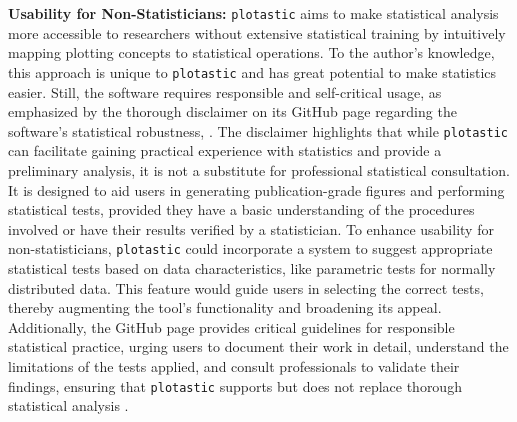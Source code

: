 \textbf{Usability for Non-Statisticians:} \texttt{plotastic} aims to make
statistical analysis more accessible to researchers without extensive
statistical training by intuitively mapping plotting concepts to statistical
operations. To the author's knowledge, this approach is unique to
\texttt{plotastic} and has great potential to make statistics easier. Still, the
software requires responsible and self-critical usage, as emphasized by the
thorough disclaimer on its GitHub page regarding the software's statistical
robustness, \cite{kuricMarkur4Plotastic2024}. The disclaimer highlights that
while \texttt{plotastic} can facilitate gaining practical experience with
statistics and provide a preliminary analysis, it is not a substitute for
professional statistical consultation. It is designed to aid users in generating
publication-grade figures and performing statistical tests, provided they have a
basic understanding of the procedures involved or have their results verified by
a statistician. To enhance usability for non-statisticians, \texttt{plotastic}
could incorporate a system to suggest appropriate statistical tests based on
data characteristics, like parametric tests for normally distributed data. This
feature would guide users in selecting the correct tests, thereby augmenting the
tool's functionality and broadening its appeal. Additionally, the GitHub page
provides critical guidelines for responsible statistical practice, urging users
to document their work in detail, understand the limitations of the tests
applied, and consult professionals to validate their findings, ensuring that
\texttt{plotastic} supports but does not replace thorough statistical analysis
\cite{sandveTenSimpleRules2013, kuricMarkur4Plotastic2024}.



